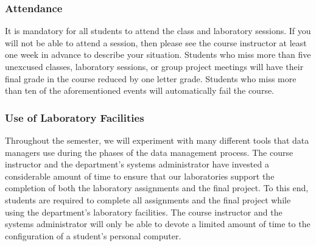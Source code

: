 \subsubsection*{Attendance}

It is mandatory for all students to attend the class and laboratory sessions. If you will not be able to attend a
session, then please see the course instructor at least one week in advance to describe your situation.  Students who
miss more than five unexcused classes, laboratory sessions, or group project meetings will have their final grade in the
course reduced by one letter grade. Students who miss more than ten of the aforementioned events will automatically fail
the course.

% 
% 

\subsubsection*{Use of Laboratory Facilities}

Throughout the semester, we will experiment with many different tools that data managers use during the phases of the
data management process.  The course instructor and the department's systems administrator have invested a considerable
amount of time to ensure that our laboratories support the completion of both the laboratory assignments and the final
project.  To this end, students are required to complete all assignments and the final project while using the
department's laboratory facilities. The course instructor and the systems administrator will only be able to devote a
limited amount of time to the configuration of a student's personal computer.

